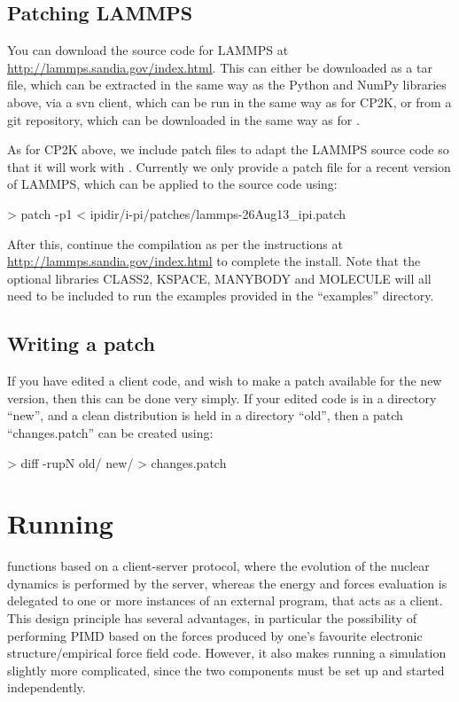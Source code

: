 \documentclass[11pt,english,fleqn]{report}
\newenvironment{code}{%
\footnotesize 
\verbatim
}{
\endverbatim
\normalsize
}
\begin{document}
\subsection{Patching LAMMPS}

You can download the source code for LAMMPS at \url{http://lammps.sandia.gov/index.html}.
This can either be downloaded as a tar file, which
can be extracted in the same way as the Python and NumPy
libraries above, via a svn client, which can be run in the
same way as for CP2K, or from a git repository, which can be downloaded
in the same way as for \ipi. 

As for CP2K above, we include patch files to
adapt the LAMMPS source code so that it will work with \ipi.
Currently we only provide a patch file for a recent 
version of LAMMPS, which can be applied to the source code using:

\begin{code}
> patch -p1 < ipidir/i-pi/patches/lammps-26Aug13_ipi.patch
\end{code}

After this, continue the compilation as per the instructions at 
\url{http://lammps.sandia.gov/index.html} to complete the install.
Note that the optional libraries CLASS2, KSPACE, MANYBODY and 
MOLECULE will all need to be included to run the examples provided
in the {}``examples'' directory.

\subsection{Writing a patch}

If you have edited a client code, and wish to make a patch available
for the new version, then this can be done very simply.
If your edited code is in a directory {}``new'', and a clean
distribution is held in a directory {}``old'', then a patch
{}``changes.patch'' can be created using:

\begin{code}
> diff -rupN old/ new/ > changes.patch
\end{code}

\section{Running \ipi}

\ipi functions based on a client-server protocol, where the evolution of the nuclear dynamics
is performed by the \ipi server, whereas the energy and forces evaluation is delegated to 
one or more instances of an external program, that acts as a client. This design principle
has several advantages, in particular the possibility of performing PIMD based on the forces
produced by one's favourite electronic structure/empirical force field code. However, it 
also makes running a simulation slightly more complicated, since the two components
must be set up and started independently.
\end{document}
